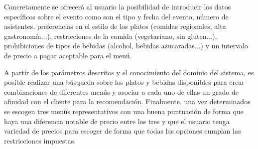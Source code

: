 \documentclass{article}
\begin{document}
\par
Concretamente se ofrecerá al usuario la posibilidad de introducir los datos específicos sobre el evento como son el tipo y fecha del evento, número de asistentes, preferencias en el estilo de los platos (comidas regionales, alta gastronomía...), restricciones de la comida (vegetariano, sin gluten...), prohibiciones de tipos de bebidas (alcohol, bebidas azucaradas...) y un intervalo de precio a pagar aceptable para el menú.
\par
A partir de los parámetros descritos y el conocimiento del dominio del sistema, es posible realizar una búsqueda sobre los platos y bebidas disponibles para crear combinaciones de diferentes menús y asociar a cada uno de ellas un grado de afinidad con el cliente para la recomendación. Finalmente, una vez determinados se escogen tres menús representativos con una buena puntuación de forma que haya una diferencia notable de precio entre los tres y que el usuario tenga variedad de precios para escoger de forma que todas las opciones cumplan las restricciones impuestas.
\end{document}
